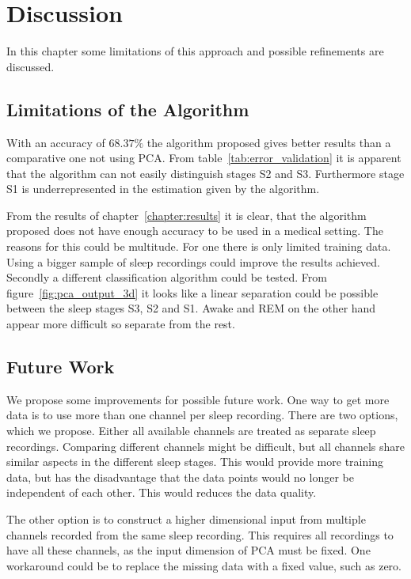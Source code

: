 \chapter{Discussion}
\label{chapter:discussion}

In this chapter some limitations of this approach and possible refinements are discussed.

\section{Limitations of the Algorithm}

With an accuracy of $68.37\%$ the algorithm proposed gives better results than a comparative one not using PCA. From table~\ref{tab:error_validation} it is apparent that the algorithm can not easily distinguish stages S2 and S3. Furthermore stage S1 is underrepresented in the estimation given by the algorithm.

From the results of chapter~\ref{chapter:results} it is clear, that the algorithm proposed does not have enough accuracy to be used in a medical setting. The reasons for this could be multitude. For one there is only limited training data. Using a bigger sample of sleep recordings could improve the results achieved. Secondly a different classification algorithm could be tested. From figure~\ref{fig:pca_output_3d} it looks like a linear separation could be possible between the sleep stages S3, S2 and S1. Awake and REM on the other hand appear more difficult so separate from the rest.

\section{Future Work}
We propose some improvements for possible future work. One way to get more data is to use more than one channel per sleep recording. There are two options, which we propose. Either all available channels are treated as separate sleep recordings. Comparing different channels might be difficult, but all channels share similar aspects in the different sleep stages. This would provide more training data, but has the disadvantage that the data points would no longer be independent of each other. This would reduces the data quality.

The other option is to construct a higher dimensional input from multiple channels recorded from the same sleep recording. This requires all recordings to have all these channels, as the input dimension of PCA must be fixed. One workaround could be to replace the missing data with a fixed value, such as zero.

